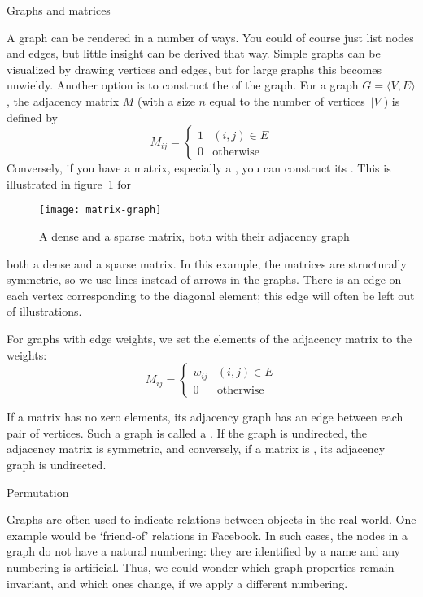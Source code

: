 
 {Graphs and matrices}

A graph can be rendered in a number of ways. You could of course just
list nodes and edges, but little insight can be derived that way.
Simple graphs can be  visualized by drawing vertices and edges, but
for large graphs this becomes unwieldy. Another option is to construct
the  of the graph. For a graph $G=\langle
V,E\rangle$, the adjacency matrix $M$ (with a size $n$ equal to the
number of vertices~$|V|$) is defined by
\[ 
  M_{ij}=
  \begin{cases}1&(i,j)\in E\\ 0&\mbox{otherwise}\end{cases}
\]
Conversely, if you have a matrix, especially a
, you can construct its
.
This is illustrated in figure~\ref{fig:matrix-graph} for
\begin{figure}[ht]
  \texttt{[image: matrix-graph]}
  \caption{A dense and a sparse matrix, both with their adjacency
    graph}
  \label{fig:matrix-graph}
\end{figure}
both a dense and a sparse matrix. In this example, the matrices are
structurally symmetric, so we use lines instead of arrows in the
graphs. There is an edge on each vertex corresponding to the diagonal
element; this edge will often be left out of illustrations.

For graphs with edge weights, we set the elements of the adjacency
matrix to the weights:
\[ 
  M_{ij}=
  \begin{cases}w_{ij}&(i,j)\in E\\ 0&\mbox{otherwise}\end{cases}
\]

If a matrix has no zero elements, its adjacency graph has an edge
between each pair of vertices. Such a graph is called a
.
If the graph is undirected, the adjacency matrix is symmetric, and
conversely, if a matrix is , its
adjacency graph is undirected.

 {Permutation}

Graphs are often used to indicate relations between objects in the 
real world. One example would be `friend-of' relations in Facebook.
In such cases, the nodes in a graph do not have a natural numbering:
they are identified by a name and any numbering is artificial.
Thus, we could wonder which graph properties remain invariant,
and which ones change, if we apply a different numbering.

